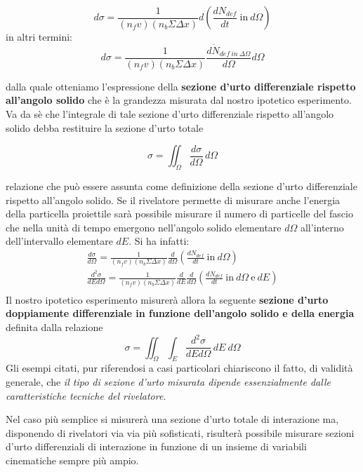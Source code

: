 \[
	d \sigma = \frac{1}{(n_fv)(n_b \Sigma \Delta x)}d \left( \frac{dN_{def}}{dt} \ \text{in} \ d\Omega\right)
\]
in altri termini:
\[
	d \sigma = \frac{1}{(n_fv)(n_b \Sigma \Delta x)} \frac{d\dot{N}_{def \ in \ \Delta \Omega}}{d \Omega} d \Omega
\]

dalla quale otteniamo l'espressione della \textbf{sezione d'urto
differenziale rispetto all'angolo solido} che è la grandezza misurata
dal nostro ipotetico esperimento.
Va da sè che l'integrale di tale
sezione d'urto differenziale rispetto all'angolo solido debba restituire
la sezione d'urto totale

\begin{equation}
	\boxed{ \sigma = \iint_{\Omega}\frac{d \sigma}{d \Omega} \, d \Omega }
\end{equation}

relazione che può essere assunta come definizione della sezione d'urto
differenziale rispetto all'angolo solido.
Se il rivelatore permette di
misurare anche l'energia della particella proiettile sarà possibile
misurare il numero di particelle del fascio che nella unità di tempo
emergono nell'angolo solido elementare \(d \Omega\) all'interno
dell'intervallo elementare \(dE\).
Si ha infatti:
\begin{gather*}
	\frac{d \sigma}{d \Omega} = \frac{1}{(n_fv)(n_b \Sigma \Delta x)}\frac{d}{d \Omega} \left( \frac{dN_{def}}{dt} \ \text{in} \ d\Omega\right)\\
	\frac{d^2 \sigma}{dE d \Omega} = \frac{1}{(n_fv)(n_b \Sigma \Delta x)}\frac{d}{dE}\frac{d}{d \Omega} \left( \frac{dN_{def}}{dt} \ \text{in} \ d\Omega \ \text{e} \ dE\right)\\
\end{gather*}
Il nostro ipotetico esperimento misurerà allora la seguente
\textbf{sezione d'urto doppiamente differenziale in funzione dell'angolo
solido e della energia} definita dalla relazione
\[
	\sigma = \iint_{\Omega}\int_{E} \frac{d^2 \sigma}{dE d \Omega} \, dE \ d \Omega
\]
Gli esempi citati, pur riferendosi a casi particolari chiariscono il fatto, di validità generale, che \emph{il tipo di sezione d'urto misurata dipende essenzialmente dalle caratteristiche tecniche del rivelatore}.

Nel caso più semplice si misurerà una sezione d'urto totale di interazione ma, disponendo di rivelatori via via più sofisticati, risulterà possibile misurare sezioni d'urto differenziali di interazione in funzione di un insieme di variabili cinematiche sempre più ampio.

